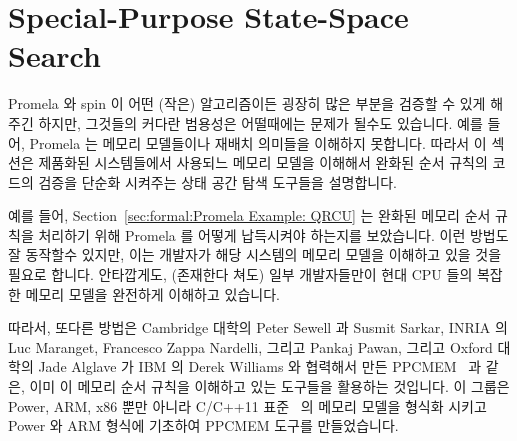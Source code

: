 
\section{Special-Purpose State-Space Search}
\label{sec:formal:Special-Purpose State-Space Search}

Promela 와 spin 이 어떤 (작은) 알고리즘이든 굉장히 많은 부분을 검증할 수 있게
해주긴 하지만, 그것들의 커다란 범용성은 어떨때에는 문제가 될수도 있습니다.
예를 들어, Promela 는 메모리 모델들이나 재배치 의미들을 이해하지 못합니다.
따라서 이 섹션은 제품화된 시스템들에서 사용되느 메모리 모델을 이해해서 완화된
순서 규칙의 코드의 검증을 단순화 시켜주는 상태 공간 탐색 도구들을 설명합니다.

예를 들어,
Section~\ref{sec:formal:Promela Example: QRCU}
는 완화된 메모리 순서 규칙을 처리하기 위해 Promela 를 어떻게 납득시켜야
하는지를 보았습니다.
이런 방법도 잘 동작할수 있지만, 이는 개발자가 해당 시스템의 메모리 모델을
이해하고 있을 것을 필요로 합니다.
안타깝게도, (존재한다 쳐도) 일부 개발자들만이 현대 CPU 들의 복잡한 메모리
모델을 완전하게 이해하고 있습니다.
\iffalse

Although Promela and spin allow you to verify pretty much any (smallish)
algorithm, their very generality can sometimes be a curse.
For example, Promela does not understand memory models or any sort
of reordering semantics.
This section therefore describes some state-space search tools that
understand memory models used by production systems, greatly simplifying the
verification of weakly ordered code.

For example,
Section~\ref{sec:formal:Promela Example: QRCU}
showed how to convince Promela to account for weak memory ordering.
Although this approach can work well, it requires that the developer
fully understand the system's memory model.
Unfortunately, few (if any) developers fully understand the complex
memory models of modern CPUs.
\fi

따라서, 또다른 방법은
Cambridge 대학의 Peter Sewell 과 Susmit Sarkar, INRIA 의 Luc Maranget,
Francesco Zappa Nardelli, 그리고 Pankaj Pawan, 그리고 Oxford 대학의 Jade
Alglave 가 IBM 의 Derek Williams 와 협력해서 만든
PPCMEM~\cite{JadeAlglave2011ppcmem} 과 같은, 이미 이 메모리 순서 규칙을
이해하고 있는 도구들을 활용하는 것입니다.
이 그룹은 Power, ARM, x86 뿐만 아니라 C/C++11 표준~\cite{PeteBecker2011N3242}
의 메모리 모델을 형식화 시키고 Power 와 ARM 형식에 기초하여 PPCMEM 도구를
만들었습니다.
\iffalse

Therefore, another approach is to use a tool that already understands
this memory ordering, such as the PPCMEM tool produced by
Peter Sewell and Susmit Sarkar at the University of Cambridge, Luc
Maranget, Francesco Zappa Nardelli, and Pankaj Pawan at INRIA, and Jade
Alglave at Oxford University, in cooperation with Derek Williams of
IBM~\cite{JadeAlglave2011ppcmem}.
This group formalized the memory models of Power, ARM, x86, as well
as that of the C/C++11 standard~\cite{PeteBecker2011N3242}, and
produced the PPCMEM tool based on the Power and ARM formalizations.
\fi

